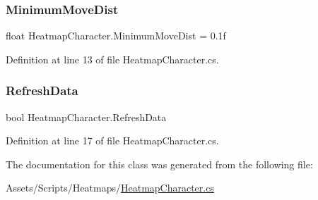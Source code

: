 \subsubsection{\texorpdfstring{Minimum\+Move\+Dist}{MinimumMoveDist}}
{\footnotesize\ttfamily float Heatmap\+Character.\+Minimum\+Move\+Dist = 0.\+1f}



Definition at line 13 of file Heatmap\+Character.\+cs.

\mbox{\label{class_heatmap_character_a3b5bf7f91b2ba8f53cc0a48b1a58a453}} 
\subsubsection{\texorpdfstring{Refresh\+Data}{RefreshData}}
{\footnotesize\ttfamily bool Heatmap\+Character.\+Refresh\+Data}



Definition at line 17 of file Heatmap\+Character.\+cs.



The documentation for this class was generated from the following file\+:\begin{DoxyCompactItemize}
\item 
Assets/\+Scripts/\+Heatmaps/\mbox{\hyperlink{_heatmap_character_8cs}{Heatmap\+Character.\+cs}}\end{DoxyCompactItemize}
